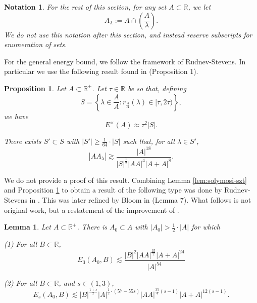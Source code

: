 \documentclass[reqno]{amsart}
\numberwithin{equation}{section}
\newtheorem{lemma}[theorem]{Lemma}
\newtheorem{prop}[theorem]{Proposition}
\newtheorem{notation}[theorem]{Notation}
\begin{document}
\begin{notation}
For the rest of this section, for any set \(A \subset \mathbb{R} \), we let
\[
    A_{\lambda} := A \cap \left( \frac{A}{\lambda}  \right)
.\]
We do not use this notation after this section, and instead reserve subscripts for
enumeration of sets.
\end{notation}

For the general energy bound, we follow the framework of Rudnev-Stevens.
In particular we use the following result found in \cite{rudnev-stevens} (Proposition 1).

\begin{prop}\label{prop:rs-result}
Let \(A \subset \mathbb{R}^{+} \). Let \(\tau \in \mathbb{R} \) be so that, defining
\[
    S = \left\{ \lambda \in \frac{A}{A}  : r_{\frac{A}{A} } (\lambda) \in [\tau,2\tau) \right\} 
,\]
we have
\[
    E^{\times }(A) \approx \tau^{2} \left\lvert S  \right\rvert 
.\]

There exists \(S ' \subset S \) with \(\left\lvert S ' \right\rvert \geq \frac{1}{64} \cdot \left\lvert S \right\rvert \) such that,
for all \(\lambda \in S'\),
\[
    \left\lvert A A_{\lambda}  \right\rvert \gtrsim \frac{\left\lvert A \right\rvert ^{18}}{\left\lvert S  \right\rvert ^{\frac{1}{2} } \left\lvert AA \right\rvert ^{4} \left\lvert A + A \right\rvert ^{8}}
.\]
\end{prop}

We do not provide a proof of this result. Combining Lemma \ref{lem:solymosi-szt} and Proposition \ref{prop:rs-result} to obtain a result of the following type was
done by Rudnev-Stevens in \cite{rudnev-stevens}. This was later refined by Bloom in \cite{bloom} (Lemma 7).
What follows is not original work, but a restatement of the improvement of \cite{bloom}.

\begin{lemma}\label{lem:SP-szt}
Let \(A \subset \mathbb{R} ^{+}\). There is \(A_0 \subset A\) with \(\left\lvert A_0 \right\rvert > \frac{1}{2} \cdot \left\lvert A \right\rvert \) for which

(1) For all \(B \subset \mathbb{R} \), 
\[
    E_3(A_0,B) \lesssim \frac{\left\lvert B \right\rvert ^{2} \left\lvert AA \right\rvert ^{\frac{35}{2} } \left\lvert A + A \right\rvert ^{24}}{\left\lvert A \right\rvert ^{54}} 
\]

(2) For all \(B \subset \mathbb{R} \), and \(s \in (1,3)\),
\[
    E_{s} (A_0,B) \lesssim \left\lvert B \right\rvert ^{\frac{1 + s}{2} } \left\lvert A \right\rvert ^{\frac{1}{2} \cdot \left( 57 - 55s \right) } \left\lvert AA \right\rvert ^{\frac{35}{4} (s-1)} \left\lvert A+A \right\rvert ^{12 \left( s-1 \right) }
.\]
\end{lemma}
\end{document}
